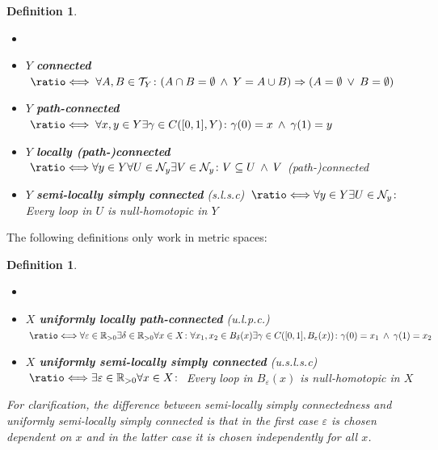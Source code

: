 \documentclass[a4paper, 11pt, twoside]{article}
\newcommand{\R}[0]{\mathbb{R}}
\newcommand{\T}[0]{\mathcal{T}}
\newcommand{\NB}[0]{\mathcal{N}}
\newcommand*{\longeq}{\ratio\Longleftrightarrow}
\theoremstyle{break}
\theoremstyle{break}
\newtheorem{defin}[thm]{Definition}
\begin{document}
\begin{defin} \label{def:connectedness}
  \begin{itemize}
    \item[] %
    \item $Y$ \textbf{connected} $\;\longeq\; \forall A,B \in \T_Y\colon (A \cap B = \emptyset \: \land \: Y = A \cup B) \Rightarrow (A = \emptyset \: \lor \: B = \emptyset)$
    \item $Y$ \textbf{path-connected} $\;\longeq\; \forall x,y \in Y \exists\gamma \in C([0,1], Y)\colon \gamma(0) = x \: \land \: \gamma(1) = y$
    \item $Y$ \textbf{locally (path-)connected} $\;\longeq \\ \forall y \in Y\forall U \in \NB_y\exists V\in \NB_y\colon V \subseteq U \: \land \: V$ (path-)connected
    \item $Y$ \textbf{semi-locally simply connected} (s.l.s.c) $\: \longeq \\ \forall y\in Y\exists U \in \NB_y\colon$ Every loop in $U$ is null-homotopic in $Y$
  \end{itemize}
\end{defin}

The following definitions only work in metric spaces:

\begin{defin}
  \begin{itemize}
    \item[] %
    \item $X$ \textbf{uniformly locally path-connected} (u.l.p.c.) $\: \longeq \\ \forall \varepsilon \in \R_{>0} \exists \delta \in \R_{>0}\forall x \in X\colon \forall x_1, x_2 \in B_{\delta}(x)\exists \gamma \in C([0,1], B_{\varepsilon}(x))\colon \gamma(0) = x_1 \: \land \: \gamma(1) = x_2$
    \item $X$ \textbf{uniformly semi-locally simply connected} (u.s.l.s.c) $\: \longeq \\ \exists \varepsilon \in \R_{>0}\forall x\in X\colon$ Every loop in $B_{\varepsilon}(x)$ is null-homotopic in $X$
  \end{itemize}
  \vspace*{10pt}
  For clarification, the difference between semi-locally simply connectedness and uniformly semi-locally simply connected is 
  that in the first case $\varepsilon$ is chosen dependent on $x$ and in the latter case it is chosen independently for all $x$.
\end{defin}
\end{document}
